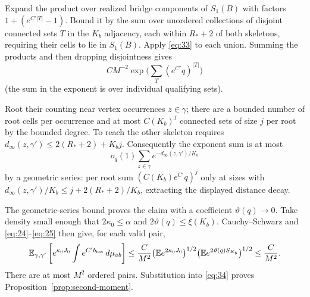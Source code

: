 Expand the product over realized bridge components of $S_1(B)$ with
factors $1+(e^{C'|T|}-1)$. Bound it by the sum over unordered
collections of disjoint connected sets $T$ in the $K_b$ adjacency,
each within $R_*+2$ of both skeletons, requiring their cells to lie in
$S_1(B)$. Apply \eqref{eq:33} to each union. Summing the products and
then dropping disjointness gives
\[
                   C M^{-2}
                     \exp\Big(\sum_T(e^{C'}q)^{|T|}\Big)
\]
(the sum in the exponent is over individual qualifying sets). 

Root their counting near vertex occurrences \(z\in\gamma\); there are a bounded number of root cells per occurrence and at most \(C(K_b)^j\) connected sets of size \(j\) per root by the bounded degree. To reach the other skeleton requires \(d_\infty(z,\gamma')\le 2(R_*+2)+K_b j\). Consequently the exponent sum is at most
\[
                        o_q(1)\sum_{z\in\gamma}
                                     e^{-d_\infty(z,\gamma')/K_b}
\]
by a geometric series: per root sum \((C(K_b)e^{C'}q)^j\) only at sizes with \(d_\infty(z,\gamma')/K_b\le j+2(R_*+2)/K_b\), extracting the displayed distance decay. 

The geometric-series bound proves the claim with a coefficient
$\vartheta(q)\to0$. Take density small enough that $2\kappa_0\le\alpha$
and $2\vartheta(q)\le\xi(K_b)$. Cauchy--Schwarz and
\eqref{eq:24}--\eqref{eq:25} then give, for each valid pair,
\[
 \mathbb E_{\gamma,\gamma'}
 \left[e^{\kappa_0J_0}\int e^{C'b_{\rm tot}}\,d\mu_{ab}\right]
 \le \frac C{M^2}
       \bigl(\mathbb Ee^{2\kappa_0J_0}\bigr)^{1/2}
       \bigl(\mathbb Ee^{2\vartheta(q)S_{K_b}}\bigr)^{1/2}
 \le \frac C{M^2}.
\]
There are at most $M^2$ ordered pairs. Substitution into
\eqref{eq:34} proves Proposition~\ref{prop:second-moment}.
